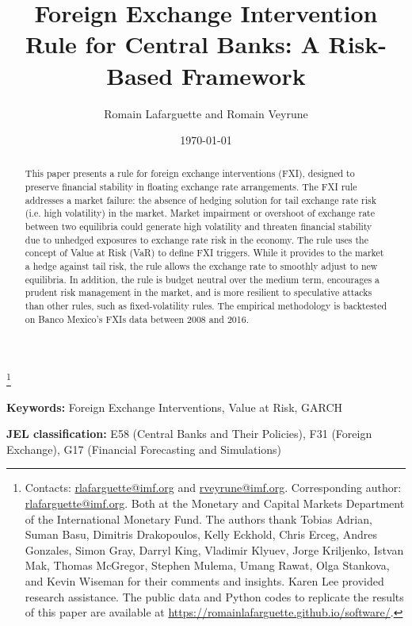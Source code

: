 \documentclass[11pt]{article}
\title{\textbf{Foreign Exchange Intervention Rule for Central Banks:
A Risk-Based Framework}}
\author{Romain Lafarguette and Romain Veyrune}
\date{\today}
\newcommand\blfootnote[1]{%
  \begingroup
  \renewcommand\thefootnote{}\footnote{#1}%
  \addtocounter{footnote}{-1}%
  \endgroup
}
\begin{document}
\maketitle      \blfootnote{Contacts:      \url{rlafarguette@imf.org}      and
\url{rveyrune@imf.org}. Corresponding author: \url{rlafarguette@imf.org}. Both
at the Monetary and Capital Markets  Department of the International Monetary Fund.  The authors thank
Tobias Adrian, Suman Basu, Dimitris Drakopoulos, Kelly Eckhold, Chris Erceg,
Andres Gonzales, Simon Gray, Darryl King, Vladimir  Klyuev, Jorge Kriljenko,
Istvan Mak, Thomas McGregor, Stephen  Mulema, Umang Rawat,  Olga Stankova, and
Kevin  Wiseman for their  comments and  insights.  Karen  Lee provided
research assistance.  The public  data and  Python codes  to  replicate the
results of  this paper  are available  at
\url{https://romainlafarguette.github.io/software/}.}


\begin{abstract} This paper presents a rule for foreign exchange interventions
(FXI),  designed to  preserve financial  stability in  floating exchange  rate
arrangements. The FXI rule addresses a  market failure: the absence of hedging
solution for  tail exchange rate risk  (i.e.  high volatility) in  the market.
Market impairment or  overshoot of exchange rate between  two equilibria could
generate  high volatility  and threaten  financial stability  due to  unhedged
exposures to exchange rate  risk in the economy.  The rule  uses the concept of
Value at Risk (VaR) to define FXI  triggers. While it provides to the market a
hedge against tail risk, the rule  allows the exchange rate to smoothly adjust
to new  equilibria.  In addition, the  rule is budget neutral  over the medium
term,  encourages  a prudent  risk  management  in  the  market, and  is  more
resilient to  speculative attacks than  other rules, such  as fixed-volatility
rules.  The  empirical methodology is  backtested on Banco Mexico's  FXIs data
between 2008 and 2016.\\
\end{abstract}
\bigskip

\noindent \textbf{Keywords:} Foreign Exchange Interventions, Value at Risk, GARCH 

\medskip

\noindent \textbf{JEL classification:} E58 (Central Banks and Their Policies), F31 (Foreign Exchange), G17 (Financial Forecasting and Simulations)
\end{document}
